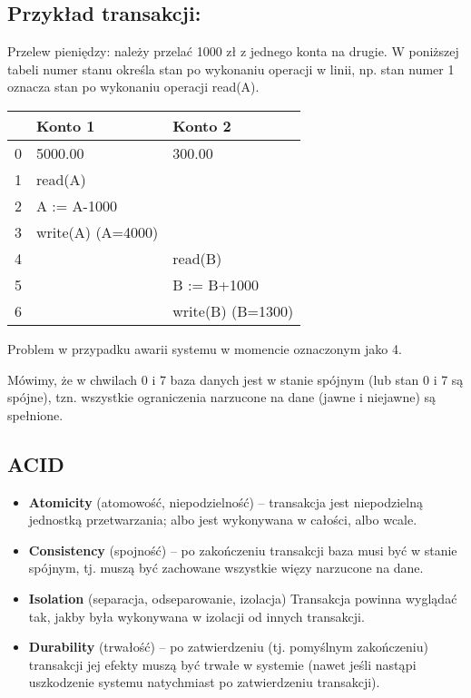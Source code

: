 \documentclass[main.tex]{subfiles}
\begin{document}
    \subsection{Przykład transakcji:}
    Przelew pieniędzy: należy przelać 1000 zł z jednego konta na drugie.
    W poniższej tabeli numer stanu określa stan po wykonaniu operacji w linii, np. stan numer 1
    oznacza stan po wykonaniu operacji read(A).

    \begin{table}[H]
        \begin{tabular}{|l|l|l|}
            \hline
            & Konto 1 & Konto 2           \\ \hline
            0 & 5000.00 & 300.00            \\ \hline
            1 & read(A)           &                   \\ \hline
            2 & A := A-1000 &                   \\ \hline
            3 & write(A) (A=4000) &                   \\ \hline
            4 & & read(B)           \\ \hline
            5 & & B := B+1000       \\ \hline
            6 & & write(B) (B=1300) \\ \hline
        \end{tabular}
    \end{table}

    Problem w przypadku awarii systemu w momencie oznaczonym jako 4.

    Mówimy, że w chwilach 0 i 7 baza danych jest w stanie spójnym (lub stan 0 i 7 są spójne), tzn.
    wszystkie ograniczenia narzucone na dane (jawne i niejawne) są spełnione.

    \subsection{ACID}
    \begin{itemize}
        \item \textbf{Atomicity} (atomowość, niepodzielność) – transakcja jest niepodzielną jednostką
        przetwarzania; albo jest wykonywana w całości, albo wcale.
        \item \textbf{Consistency} (spojność) – po zakończeniu transakcji baza musi być w stanie spójnym, tj. muszą
        być zachowane wszystkie więzy narzucone na dane.
        \item \textbf{Isolation} (separacja, odseparowanie, izolacja) Transakcja powinna wyglądać tak, jakby była
        wykonywana w izolacji od innych transakcji.
        \item \textbf{Durability} (trwałość) – po zatwierdzeniu (tj. pomyślnym zakończeniu) transakcji jej efekty
        muszą być trwałe w systemie (nawet jeśli nastąpi uszkodzenie systemu natychmiast po
        zatwierdzeniu transakcji).
    \end{itemize}
\end{document}
